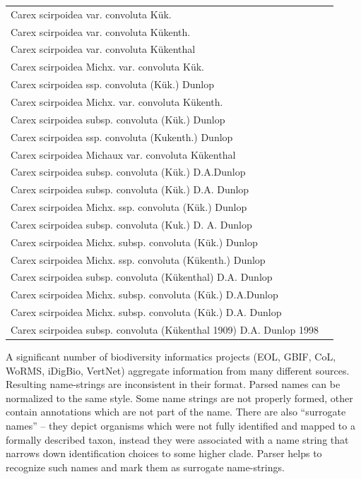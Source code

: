 \documentclass{bmcart}
\begin{document}
\begin{table}[!htb]
\begin{center}
\begin{tabular}{| l | c |}
    Carex scirpoidea var. convoluta Kük. & \\
    Carex scirpoidea var. convoluta Kükenth. & \\
    Carex scirpoidea var. convoluta Kükenthal & \\
    Carex scirpoidea Michx. var. convoluta Kük. & \\
    Carex scirpoidea ssp. convoluta (Kük.) Dunlop & \\
    Carex scirpoidea Michx. var. convoluta Kükenth. & \\
    Carex scirpoidea subsp. convoluta (Kük.) Dunlop & \\
    Carex scirpoidea ssp. convoluta (Kukenth.) Dunlop & \\
    Carex scirpoidea Michaux var. convoluta Kükenthal & \\
    Carex scirpoidea subsp. convoluta (Kük.) D.A.Dunlop & \\
    Carex scirpoidea subsp. convoluta (Kük.) D.A. Dunlop & \\
    Carex scirpoidea Michx. ssp. convoluta (Kük.) Dunlop & \\
    Carex scirpoidea subsp. convoluta (Kuk.) D. A. Dunlop & \\
    Carex scirpoidea Michx. subsp. convoluta (Kük.) Dunlop & \\
    Carex scirpoidea Michx. ssp. convoluta (Kükenth.) Dunlop & \\
    Carex scirpoidea subsp. convoluta (Kükenthal) D.A. Dunlop & \\
    Carex scirpoidea Michx. subsp. convoluta (Kük.) D.A.Dunlop & \\
    Carex scirpoidea Michx. subsp. convoluta (Kük.) D.A. Dunlop & \\
    Carex scirpoidea subsp. convoluta (Kükenthal 1909) D.A. Dunlop 1998 & \\
    \hline
    \end{tabular}
  \end{center}
\end{table}

A significant number of biodiversity informatics projects (EOL, GBIF, CoL,
WoRMS, iDigBio, VertNet) aggregate information from many different sources.
Resulting name-strings are inconsistent in their format. Parsed names can be
normalized to the same style. Some name strings are not properly formed, other
contain annotations which are not part of the name. There are also “surrogate
names” -- they depict organisms which were not fully identified and mapped to a
formally described taxon, instead they were associated with a name string that
narrows down identification choices to some higher clade. Parser helps to
recognize such names and mark them as surrogate name-strings.
\end{document}
